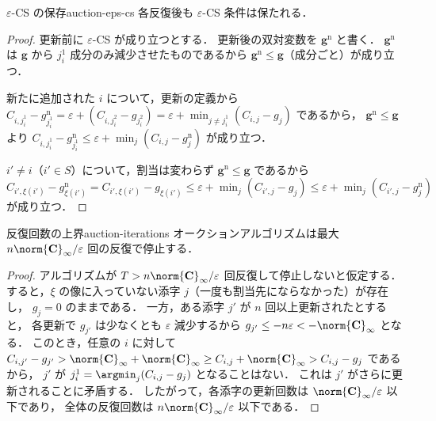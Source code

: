 \begin{proposition}{$\varepsilon$-CS の保存}{auction-eps-cs}
  各反復後も $\varepsilon$-CS 条件は保たれる．
\end{proposition}

\begin{proof}
  更新前に $\varepsilon$-CS が成り立つとする．
  更新後の双対変数を $\mathbf{g}^{\mathrm{n}}$ と書く．
  $\mathbf{g}^{\mathrm{n}}$ は $\mathbf{g}$ から $j_i^1$ 成分のみ減少させたものであるから
  $\mathbf{g}^{\mathrm{n}} \leq \mathbf{g}$（成分ごと）が成り立つ．

  新たに追加された $i$ について，更新の定義から
  $C_{i, j_i^1} - g^{\mathrm{n}}_{j_i^1} = \varepsilon + (C_{i, j_i^2} - g_{j_i^2})
  = \varepsilon + \min_{j \neq j_i^1}(C_{i,j} - g_j)$ であるから，
  $\mathbf{g}^{\mathrm{n}} \leq \mathbf{g}$ より
  $C_{i, j_i^1} - g^{\mathrm{n}}_{j_i^1}
  \leq \varepsilon + \min_j (C_{i,j} - g^{\mathrm{n}}_j)$ が成り立つ．

  $i' \neq i$（$i' \in S$）について，割当は変わらず $\mathbf{g}^{\mathrm{n}} \leq \mathbf{g}$ であるから
  $C_{i', \xi(i')} - g^{\mathrm{n}}_{\xi(i')}
  = C_{i', \xi(i')} - g_{\xi(i')}
  \leq \varepsilon + \min_j (C_{i',j} - g_j)
  \leq \varepsilon + \min_j (C_{i',j} - g^{\mathrm{n}}_j)$ が成り立つ．
\end{proof}

\begin{proposition}{反復回数の上界}{auction-iterations}
  オークションアルゴリズムは最大 $n \norm{\mathbf{C}}_\infty / \varepsilon$ 回の反復で停止する．
\end{proposition}

\begin{proof}
  アルゴリズムが $T > n\norm{\mathbf{C}}_\infty / \varepsilon$ 回反復して停止しないと仮定する．
  すると，$\xi$ の像に入っていない添字 $j$（一度も割当先にならなかった）が存在し，
  $g_j = 0$ のままである．
  一方，ある添字 $j'$ が $n$ 回以上更新されたとすると，
  各更新で $g_{j'}$ は少なくとも $\varepsilon$ 減少するから
  $g_{j'} \leq -n\varepsilon < -\norm{\mathbf{C}}_\infty$ となる．
  このとき，任意の $i$ に対して
  $C_{i,j'} - g_{j'} > \norm{\mathbf{C}}_\infty + \norm{\mathbf{C}}_\infty
  \geq C_{i,j} + \norm{\mathbf{C}}_\infty > C_{i,j} - g_j$ であるから，
  $j'$ が $j_i^1 = \argmin_j (C_{i,j} - g_j)$ となることはない．
  これは $j'$ がさらに更新されることに矛盾する．
  したがって，各添字の更新回数は $\norm{\mathbf{C}}_\infty / \varepsilon$ 以下であり，
  全体の反復回数は $n\norm{\mathbf{C}}_\infty / \varepsilon$ 以下である．
\end{proof}

